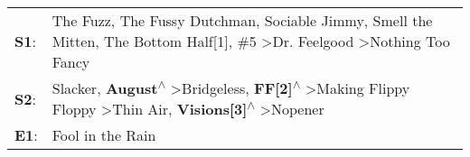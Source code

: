 \begin{supertabular}{p{0.03\textwidth}p{0.92\textwidth}}
 \textbf{S1}:  &                                            The Fuzz\textsuperscript{}, \enspace The Fussy Dutchman\textsuperscript{}, \enspace Sociable Jimmy\textsuperscript{}, \enspace Smell the Mitten\textsuperscript{}, \enspace The Bottom Half[1]\textsuperscript{}, \enspace \#5\textsuperscript{} \textgreater \enspace Dr. Feelgood\textsuperscript{} \textgreater \enspace Nothing Too Fancy\textsuperscript{}  \enspace  \\
 \textbf{S2}:  &  Slacker\textsuperscript{}, \enspace \textbf{August\textsuperscript{$\wedge$}} \textgreater \enspace Bridgeless\textsuperscript{}, \enspace \textbf{FF[2]\textsuperscript{$\wedge$}} \textgreater \enspace Making Flippy Floppy\textsuperscript{} \textgreater \enspace Thin Air\textsuperscript{}, \enspace \textbf{Visions[3]\textsuperscript{$\wedge$}} \textgreater \enspace Nopener\textsuperscript{}  \enspace  \\
 \textbf{E1}:  &                                                                                                                                                                                                                                                                                                                                                                         Fool in the Rain\textsuperscript{}  \enspace  \\
\end{supertabular}
